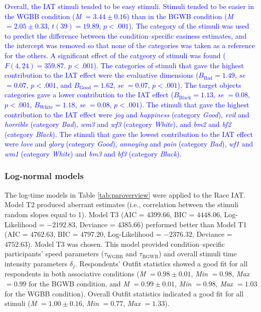 \documentclass[12pt]{book}
\begin{document}
\textcolor{blue}{Overall, the IAT stimuli tended to be easy stimuli. 
	Stimuli tended to be easier in the WGBB condition (\emph{M} $= 3.44\pm0.16 $) than in the BGWB condition (\emph{M} $= 2.05\pm 0.33$, $t(39)= 19.89$, $p<.001$). 
	The category of the stimuli was used to predict the difference between the condition--specific easiness estimates, and the intercept was removed so that none of the categories was taken as a reference for the others. 
	A significant effect of the catgeory of stimuli was found ($F(4,24)= 359.87$. $p<.001$). The categories of stimuli that gave the highest contribution to the IAT effect were the evaluative dimensions ($B_{\text{Bad}}=1.49$, \emph{se} $=0.07$, $p < .001$, and $B_{\text{Good}}=1.62$, \emph{se} $=0.07$, $p < .001$). 
	The target objects categories gave a lower contribution to the IAT effect ($B_{\text{Black}}=1.13$, \emph{se} $=0.08$, $p < .001$, $B_{\text{White}}=1.18$, \emph{se} $=0.08$, $p < .001$). 
	The stimuli that gave the highest contribution to the IAT effect were \emph{joy} and \emph{happiness} (category \emph{Good}), \emph{evil} and \emph{horrible} (category \emph{Bad}), \emph{wm3} and \emph{wf3} (category \emph{White}), and \emph{bm2} and \emph{bf2} (category \emph{Black}). 
	The stimuli that gave the lowest contribution to the IAT effect were \emph{love} and \emph{glory} (category \emph{Good}), \emph{annoying} and \emph{pain} (category \emph{Bad}), \emph{wf1} and \emph{wm1} (category \emph{White}) and \emph{bm3} and \emph{bf3} (category \emph{Black}).}

\subsubsection{Log-normal models} 
The log-time models in Table \ref{tab:paroverview} were applied to the Race IAT. 
Model T2 produced aberrant estimates (i.e., correlation between the stimuli random slopes equal to 1). Model T3 (AIC = $4399.66$, BIC = $4448.06$, Log-Likelihood = $-2192.83$, Deviance = $4385.66$) performed better than Model T1 (AIC = $4762.63$, BIC = $4797.20$, Log-Likelihood = $-2376.32$, Deviance = $4752.63$). Model T3 was chosen. This model provided condition--specific participants' speed parameters ($\tau_{\text{WGBB}}$ and $\tau_{\text{BGWB}}$) and overall stimuli time intensity parameters $\delta_j$.
Respondents’ Outfit statistics showed a good fit for all respondents in both associative conditions (\emph{M} $= 0.98 \pm 0.01$, \emph{Min} $= 0.98$, \emph{Max} $= 0.99$ for the BGWB condition, and \emph{M} $= 0.99 \pm 0.01$, \emph{Min} $=
0.98$, \emph{Max} $= 1.03$ for the WGBB condition). Overall Outfit statistics indicated a good fit for all stimuli (\emph{M} $= 1.00 \pm 0.16$, \emph{Min} $= 0.77$, \emph{Max} $= 1.33$). 
\end{document}
